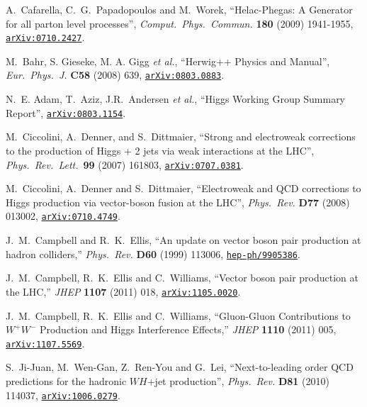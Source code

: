 \documentclass[english,12pt]{article}
\begin{document}
\begin{thebibliography}{10}
  A.~Cafarella, C.~G.~Papadopoulos and M.~Worek,
  ``{Helac-Phegas: A Generator for all parton level processes}'',
  {\em Comput.\ Phys.\ Commun.}  {\bf 180} (2009)  1941-1955,
 \href{http://arxiv.org/abs/0710.2427} {{\tt arXiv:0710.2427}}.

M.~Bahr, S. Gieseke, M. A. Gigg {\it et al.}, ``{Herwig++ Physics and Manual}'', {\em Eur.\ Phys.\ J.} 
{\bf C58} (2008) 639, 
\href{http://www.arXiv.org/abs/0803.0883}{{\tt arXiv:0803.0883}}.

N.~E. Adam, T.~Aziz, J.R.~Andersen {\em et al.}, ``{Higgs Working Group Summary Report}'',
\href{http://www.arXiv.org/abs/0803.1154}{{\tt arXiv:0803.1154}}.

M.~Ciccolini, A.~Denner, and S.~Dittmaier, ``{Strong and electroweak
  corrections to the production of Higgs + 2 jets via weak interactions at the
  LHC}'', {\em Phys.\ Rev.\ Lett.}~{\bf 99} (2007) 161803,
\href{http://www.arXiv.org/abs/0707.0381}{{\tt arXiv:0707.0381}}.

M.~Ciccolini, A.~Denner and S.~Dittmaier, ``{Electroweak and QCD corrections
  to Higgs production via vector-boson fusion at the LHC}'', {\em Phys.\ Rev.}
  {\bf D77} (2008) 013002,
\href{http://www.arXiv.org/abs/0710.4749}{{\tt arXiv:0710.4749}}.

  J.~M.~Campbell and R.~K.~Ellis,
  ``An update on vector boson pair production at hadron colliders,''
  {\em Phys.\ Rev.} {\bf D60} (1999) 113006,
  \href{http://www.arXiv.org/abs/hep-ph/9905386}{{\tt hep-ph/9905386}}.

  J.~M.~Campbell, R.~K.~Ellis and C.~Williams,
  ``Vector boson pair production at the LHC,''
  {\em JHEP} {\bf 1107} (2011) 018,
  \href{http://www.arXiv.org/abs/1105.0020}{{\tt arXiv:1105.0020}}.

  J.~M.~Campbell, R.~K.~Ellis and C.~Williams,
  ``Gluon-Gluon Contributions to $W^{+}W^{-}$ Production and Higgs Interference Effects,''
  {\em JHEP} {\bf 1110} (2011) 005,
  \href{http://www.arXiv.org/abs/1107.5569}{{\tt arXiv:1107.5569}}.

  S.~Ji-Juan, M.~Wen-Gan, Z.~Ren-You and G.~Lei,
  ``{Next-to-leading order QCD predictions for the hadronic $WH$+jet production}'',
  {\em Phys.\ Rev.} {\bf D81} (2010) 114037,
\href{http://www.arXiv.org/abs/1006.0279}{{\tt arXiv:1006.0279}}.


\end{thebibliography}
\end{document}
